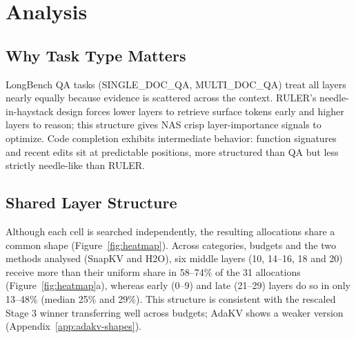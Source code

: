 \documentclass[11pt]{article}
\begin{document}
\section{Analysis}



\subsection{Why Task Type Matters}

LongBench QA tasks (SINGLE\_DOC\_QA, MULTI\_DOC\_QA) treat all layers nearly equally because evidence is scattered across the context. RULER's needle-in-haystack design forces lower layers to retrieve surface tokens early and higher layers to reason; this structure gives NAS crisp layer-importance signals to optimize. Code completion exhibits intermediate behavior: function signatures and recent edits sit at predictable positions, more structured than QA but less strictly needle-like than RULER.

\subsection{Shared Layer Structure}

Although each cell is searched independently, the resulting allocations share a common shape (Figure~\ref{fig:heatmap}). Across categories, budgets and the two methods analysed (SnapKV and H2O), six middle layers (10, 14--16, 18 and 20) receive more than their uniform share in 58--74\% of the 31 allocations (Figure~\ref{fig:heatmap}a), whereas early (0--9) and late (21--29) layers do so in only 13--48\% (median 25\% and 29\%). This structure is consistent with the rescaled Stage 3 winner transferring well across budgets; AdaKV shows a weaker version (Appendix~\ref{app:adakv-shapes}).
\end{document}
